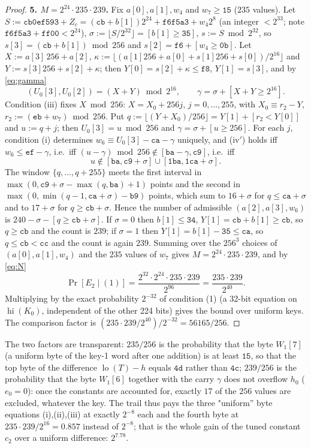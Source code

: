 \begin{proof}
\textbf{5. $M=2^{24}\cdot235\cdot239$.}
Fix $a[0],a[1],w_4$ and $w_7\ge\mathtt{15}$ ($235$ values). Let
$S:=\mathtt{cb0ef593}+Z_c=(\mathtt{cb}+b[1])2^{24}+\mathtt{f6f5a3}+w_4 2^{8}$ (an integer $<2^{33}$; note
$\mathtt{f6f5a3}+\mathtt{ff00}<2^{24}$), $\sigma:=\lfloor S/2^{32}\rfloor=[b[1]\ge\mathtt{35}]$,
$s:=S\bmod2^{32}$, so $s[3]=(\mathtt{cb}+b[1])\bmod256$ and $s[2]=\mathtt{f6}+[w_4\ge\mathtt{0b}]$.
Let $X:=a[3]\,256+a[2]$, $\kappa:=\lfloor(a[1]256+a[0]+s[1]256+s[0])/2^{16}\rfloor$ and
$Y:=s[3]256+s[2]+\kappa$; then $Y[0]=s[2]+\kappa\le\mathtt{f8}$, $Y[1]=s[3]$, and by \eqref{eq:gamma}
\[
(U_0[3],U_0[2])=(X+Y)\bmod2^{16},\qquad \gamma=\sigma+[X+Y\ge2^{16}].
\]
Condition (iii) fixes $X\bmod256$: $X=X_0+256j$, $j=0,\dots,255$, with $X_0\equiv r_2-Y$, $r_2:=(\mathtt{eb}+w_7)\bmod256$.
Put $q:=\lfloor(Y+X_0)/256\rfloor=Y[1]+[r_2<Y[0]]$ and $u:=q+j$; then $U_0[3]=u\bmod256$ and
$\gamma=\sigma+[u\ge256]$. For each $j$, condition (i) determines $w_6\equiv U_0[3]-\mathtt{ca}-\gamma$ uniquely,
and (iv$'$) holds iff $w_6\le\mathtt{ef}-\gamma$, i.e.\ iff $(u-\gamma)\bmod256\notin[\mathtt{ba}-\gamma,\mathtt{c9}]$, i.e.\ iff
\[
u\notin[\mathtt{ba},\mathtt{c9}+\sigma]\cup[\mathtt{1ba},\mathtt{1ca}+\sigma].
\]
The window $\{q,\dots,q+255\}$ meets the first interval in $\max(0,\mathtt{c9}+\sigma-\max(q,\mathtt{ba})+1)$
points and the second in $\max(0,\min(q-1,\mathtt{ca}+\sigma)-\mathtt{b9})$ points, which sum to
$16+\sigma$ for $q\le\mathtt{ca}+\sigma$ and to $17+\sigma$ for $q\ge\mathtt{cb}+\sigma$. Hence the number of
admissible $(a[2],a[3],w_6)$ is $240-\sigma-[q\ge\mathtt{cb}+\sigma]$.
If $\sigma=0$ then $b[1]\le\mathtt{34}$, $Y[1]=\mathtt{cb}+b[1]\ge\mathtt{cb}$, so $q\ge\mathtt{cb}$ and the count is
$239$; if $\sigma=1$ then $Y[1]=b[1]-\mathtt{35}\le\mathtt{ca}$, so $q\le\mathtt{cb}<\mathtt{cc}$ and the count is
again $239$. Summing over the $256^3$ choices of $(a[0],a[1],w_4)$ and the $235$ values of $w_7$ gives
$M=2^{24}\cdot235\cdot239$, and by \eqref{eq:N}
\[
\Pr[E_2\mid(1)]=\frac{2^{32}\cdot2^{24}\cdot235\cdot239}{2^{96}}=\frac{235\cdot239}{2^{40}}.
\]
Multiplying by the exact probability $2^{-32}$ of condition (1) (a 32-bit equation on
$\operatorname{hi}(K_0)$, independent of the other 224 bits) gives the bound over uniform keys.
The comparison factor is $(235\cdot239/2^{40})/2^{-32}=56165/256$.
\end{proof}

\begin{remark}
The two factors are transparent: $235/256$ is the probability that the byte $W_1[7]$ (a uniform byte of the
key-1 word after one addition) is at least $\mathtt{15}$, so that the top byte of the difference
$\operatorname{lo}(T)-h$ equals $\mathtt{4d}$ rather than $\mathtt{4c}$; $239/256$ is the probability that the byte
$W_1[6]$ together with the carry $\gamma$ does not overflow $h_0$ ($e_0=0$): once the constants are
accounted for, exactly $17$ of the $256$ values are excluded, whatever the key. The trail thus pays the three "uniform'' byte equations
(i),(ii),(iii) at exactly $2^{-8}$ each and the fourth byte at $235\cdot239/2^{16}=0.857$ instead of $2^{-8}$;
that is the whole gain of the tuned constant $c_2$ over a uniform difference: $2^{7.78}$.
\end{remark}

